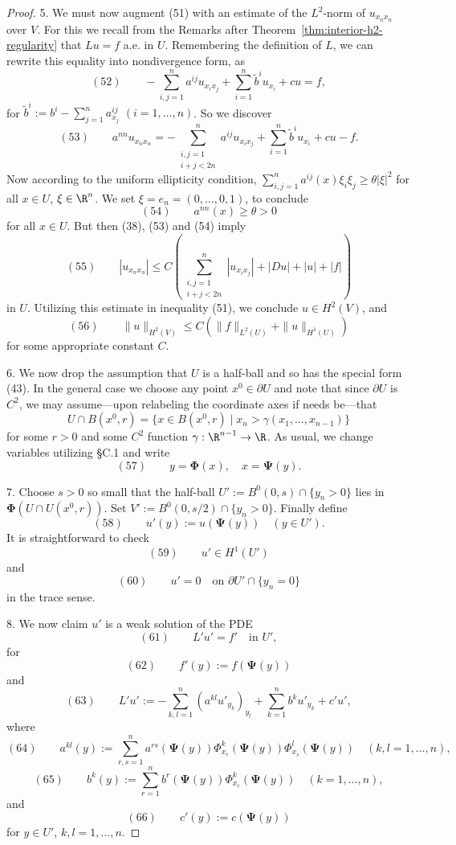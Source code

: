 \begin{proof}
5. We must now augment (51) with an estimate of the $L^2$-norm of $u_{x_nx_n}$ over $V$. For this we recall from the Remarks after Theorem~\ref{thm:interior-h2-regularity} that $Lu = f$ a.e. in $U$. Remembering the definition of $L$, we can rewrite this equality into nondivergence form, as
$$(52) \qquad -\sum_{i,j=1}^n a^{ij}u_{x_ix_j} + \sum_{i=1}^n \tilde b^iu_{x_i} + cu = f,$$
for $\tilde b^i := b^i - \sum_{j=1}^n a^{ij}_{x_j}$ $(i=1,\ldots,n)$. So we discover
$$(53) \qquad a^{nn}u_{x_nx_n} = -\sum_{\substack{i,j=1 \\ i+j<2n}}^n a^{ij}u_{x_ix_j} + \sum_{i=1}^n \tilde b^iu_{x_i} + cu - f.$$
Now according to the uniform ellipticity condition, $\sum_{i,j=1}^n a^{ij}(x)\xi_i\xi_j \geq \theta|\xi|^2$ for all $x \in U$, $\xi \in \R^n$. We set $\xi = e_n = (0,\ldots,0,1)$, to conclude
$$(54) \qquad a^{nn}(x) \geq \theta > 0$$
for all $x \in U$. But then (38), (53) and (54) imply
$$(55) \qquad |u_{x_nx_n}| \leq C\left(\sum_{\substack{i,j=1 \\ i+j<2n}}^n |u_{x_ix_j}| + |Du| + |u| + |f|\right)$$
in $U$. Utilizing this estimate in inequality (51), we conclude $u \in H^2(V)$, and
$$(56) \qquad \|u\|_{H^2(V)} \leq C(\|f\|_{L^2(U)}+\|u\|_{H^1(U)})$$
for some appropriate constant $C$.

6. We now drop the assumption that $U$ is a half-ball and so has the special form (43). In the general case we choose any point $x^0 \in \partial U$ and note that since $\partial U$ is $C^2$, we may assume---upon relabeling the coordinate axes if needs be---that
$$U \cap B(x^0,r) = \{x \in B(x^0,r) \mid x_n > \gamma(x_1,\ldots,x_{n-1})\}$$
for some $r > 0$ and some $C^2$ function $\gamma : \R^{n-1} \to \R$. As usual, we change variables utilizing \S C.1 and write
$$(57) \qquad y = \boldsymbol\Phi(x), \quad x = \boldsymbol\Psi(y).$$

7. Choose $s > 0$ so small that the half-ball $U' := B^0(0,s) \cap \{y_n > 0\}$ lies in $\boldsymbol\Phi(U \cap U(x^0,r))$. Set $V' := B^0(0,s/2) \cap \{y_n > 0\}$. Finally define
$$(58) \qquad u'(y) := u(\boldsymbol\Psi(y)) \quad (y \in U').$$
It is straightforward to check
$$(59) \qquad u' \in H^1(U')$$
and
$$(60) \qquad u' = 0 \quad \text{on } \partial U' \cap \{y_n = 0\}$$
in the trace sense.

8. We now claim $u'$ is a weak solution of the PDE
$$(61) \qquad L'u' = f' \quad \text{in } U',$$
for
$$(62) \qquad f'(y) := f(\boldsymbol\Psi(y))$$
and
$$(63) \qquad L'u' := -\sum_{k,l=1}^n (a^{kl}u'_{y_k})_{y_l} + \sum_{k=1}^n b^ku'_{y_k} + c'u',$$
where
$$(64) \qquad a^{kl}(y) := \sum_{r,s=1}^n a^{rs}(\boldsymbol\Psi(y))\Phi^k_{x_r}(\boldsymbol\Psi(y))\Phi^l_{x_s}(\boldsymbol\Psi(y)) \quad (k,l=1,\ldots,n),$$
$$(65) \qquad b^k(y) := \sum_{r=1}^n b^r(\boldsymbol\Psi(y))\Phi^k_{x_r}(\boldsymbol\Psi(y)) \quad (k=1,\ldots,n),$$
and
$$(66) \qquad c'(y) := c(\boldsymbol\Psi(y))$$
for $y \in U'$, $k,l = 1,\ldots,n$.


\end{proof}
